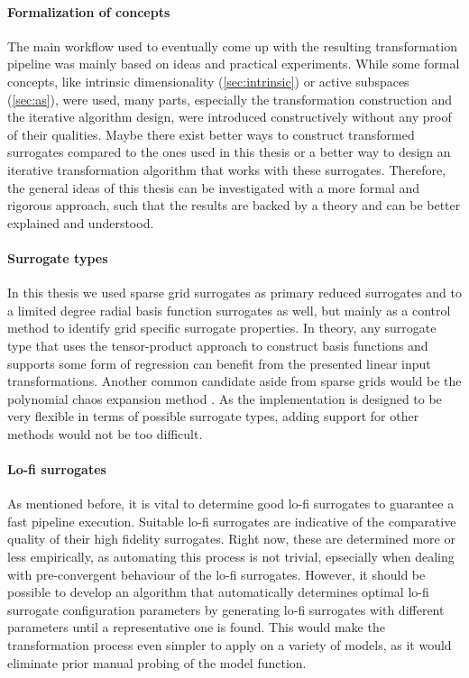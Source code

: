 \documentclass[
  a4paper,  %
  twoside,  %
  bibliography=totoc,
  headsepline,
  cleardoublepage=empty,
  parskip=half,
  draft=false
]{scrbook}
\begin{document}
\paragraph{Formalization of concepts}
The main workflow used to eventually come up with the resulting transformation pipeline was mainly based on ideas and practical experiments.
While some formal concepts, like intrinsic dimensionality (\cref{sec:intrinsic}) or active subspaces (\cref{sec:as}), were used, many parts, especially the transformation construction and the iterative algorithm design, were introduced constructively without any proof of their qualities.
Maybe there exist better ways to construct transformed surrogates compared to the ones used in this thesis or a better way to design an iterative transformation algorithm that works with these surrogates.
Therefore, the general ideas of this thesis can be investigated with a more formal and rigorous approach, such that the results are backed by a theory and can be better explained and understood.

\paragraph{Surrogate types}
In this thesis we used sparse grid surrogates as primary reduced surrogates and to a limited degree radial basis function surrogates as well, but mainly as a control method to identify grid specific surrogate properties.
In theory, any surrogate type that uses the tensor-product approach to construct basis functions and supports some form of regression can benefit from the presented linear input transformations.
Another common candidate aside from sparse grids would be the polynomial chaos expansion method \cite{Crestaux2009}.
As the implementation is designed to be very flexible in terms of possible surrogate types, adding support for other methods would not be too difficult.

\paragraph{Lo-fi surrogates}
As mentioned before, it is vital to determine good lo-fi surrogates to guarantee a fast pipeline execution.
Suitable lo-fi surrogates are indicative of the comparative quality of their high fidelity surrogates.
Right now, these are determined more or less empirically, as automating this process is not trivial, epsecially when dealing with pre-convergent behaviour of the lo-fi surrogates.
However, it should be possible to develop an algorithm that automatically determines optimal lo-fi surrogate configuration parameters by generating lo-fi surrogates with different parameters until a representative one is found.
This would make the transformation process even simpler to apply on a variety of models, as it would eliminate prior manual probing of the model function.
\end{document}
